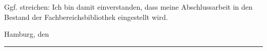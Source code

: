 \documentclass[
    fontsize=12pt,
    headings=small,
    parskip=half,           %
    bibliography=totoc,
    numbers=noenddot,       %
    open=any,               %
    ]{scrreprt}
\begin{document}
Ggf. streichen: Ich bin damit einverstanden, dass meine Abschlussarbeit in den
Bestand der Fachbereichsbibliothek eingestellt wird.

\makeatletter
Hamburg, den {\@date}
\makeatother

\vspace{2cm}
\rule{6cm}{0.25pt}\\
\makeatletter
{\@author} \par
\makeatother





\listoftodos
\end{document}
